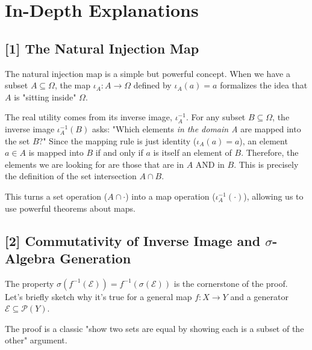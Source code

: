 \documentclass[11pt,a4paper]{article}
\begin{document}
\newpage
\section*{In-Depth Explanations}
\hypertarget{exp3}{}
\subsection*{[1] The Natural Injection Map}
The natural injection map is a simple but powerful concept. When we have a subset $A \subseteq \Omega$, the map $\iota_A: A \to \Omega$ defined by $\iota_A(a) = a$ formalizes the idea that $A$ is "sitting inside" $\Omega$.

The real utility comes from its inverse image, $\iota_A^{-1}$. For any subset $B \subseteq \Omega$, the inverse image $\iota_A^{-1}(B)$ asks: "Which elements \emph{in the domain A} are mapped into the set $B$?"
Since the mapping rule is just identity ($\iota_A(a) = a$), an element $a \in A$ is mapped into $B$ if and only if $a$ is itself an element of $B$. Therefore, the elements we are looking for are those that are in $A$ AND in $B$. This is precisely the definition of the set intersection $A \cap B$.

This turns a set operation ($A \cap \cdot$) into a map operation ($\iota_A^{-1}(\cdot)$), allowing us to use powerful theorems about maps.

\hypertarget{exp2}{}
\subsection*{[2] Commutativity of Inverse Image and $\sigma$-Algebra Generation}

The property $\sigma(f^{-1}(\mathcal{E})) = f^{-1}(\sigma(\mathcal{E}))$ is the cornerstone of the proof. Let's briefly sketch why it's true for a general map $f: X \to Y$ and a generator $\mathcal{E} \subseteq \mathcal{P}(Y)$.

The proof is a classic "show two sets are equal by showing each is a subset of the other" argument.
\end{document}
